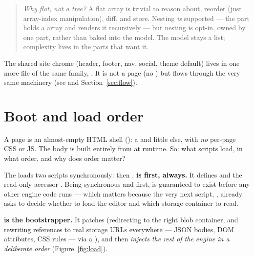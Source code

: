 \documentclass[11pt]{article}
\begin{document}
\begin{quote}
\small\emph{Why flat, not a tree?} A flat array is trivial to reason about,
reorder (just array-index manipulation), diff, and store. Nesting \emph{is}
supported --- the  part holds a  array and
renders it recursively --- but nesting is opt-in, owned by one part, rather than
baked into the model. The model stays a list; complexity lives in the parts that
want it.
\end{quote}

The shared site chrome (header, footer, nav, social, theme default) lives in one
more file of the same family, . It is not a page (no
) but flows through the very same machinery (see 
and Section~\ref{sec:flow}).

\section{Boot and load order}

A page is an almost-empty HTML shell (): a
 and little else, with \emph{no} per-page CSS or JS. The body
is built entirely from  at runtime. So: what scripts load, in
what order, and why does order matter?

The  loads two scripts synchronously:  then
. \textbf{ is first, always.} It defines
 and the read-only accessor . Being
synchronous and first,  is guaranteed to exist before any other
engine code runs --- which matters because the very next script,
, already asks  to decide whether to
load the editor and which storage container to read.

\textbf{ is the bootstrapper.} It patches 
(redirecting  to the right blob container, and rewriting
 references to real storage URLs everywhere --- JSON
bodies, DOM attributes, CSS rules --- via a ), and then
\emph{injects the rest of the engine in a deliberate order}
(Figure~\ref{fig:load}).
\end{document}
